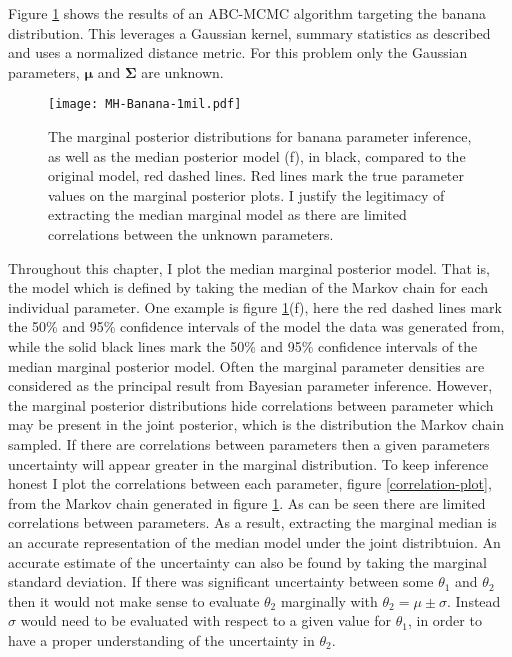 Figure \ref{MH-banana} shows the results of an ABC-MCMC algorithm targeting the banana distribution. This leverages a Gaussian kernel, summary statistics as described and uses a normalized distance metric. For this problem only the Gaussian parameters, $\bm{\mu}$ and $\bm{\Sigma}$ are unknown.\\

\begin{figure}[H]
	\centering
	\texttt{[image: MH-Banana-1mil.pdf]}
	\caption{The marginal posterior distributions for banana parameter inference, as well as the median posterior model (f), in black, compared to the original model, red dashed lines. Red lines mark the true parameter values on the marginal posterior plots. I justify the legitimacy of extracting the median marginal model as there are limited correlations between the unknown parameters.}
	\label{MH-banana}
\end{figure}

Throughout this chapter, I plot the median marginal posterior model. That is, the model which is defined by taking the median of the Markov chain for each individual parameter. One example is figure \ref{MH-banana}(f), here the red dashed lines mark the 50\% and 95\% confidence intervals of the model the data was generated from, while the solid black lines mark the 50\% and 95\% confidence intervals of the median marginal posterior model. Often the marginal parameter densities are considered as the principal result from Bayesian parameter inference. However, the marginal posterior distributions hide correlations between parameter which may be present in the joint posterior, which is the distribution the Markov chain sampled. If there are correlations between parameters then a given parameters uncertainty will appear greater in the marginal distribution. To keep inference honest I plot the correlations between each parameter, figure \ref{correlation-plot}, from the Markov chain generated in figure \ref{MH-banana}. As can be seen there are limited correlations between parameters. As a result, extracting the marginal median is an accurate representation of the median model under the joint distribtuion. An accurate estimate of the uncertainty can also be found by taking the marginal standard deviation. If there was significant uncertainty between some $\theta_1$ and $\theta_2$ then it would not make sense to evaluate $\theta_2$ marginally with $\theta_2 = \mu \pm \sigma$. Instead $\sigma$ would need to be evaluated with respect to a given value for $\theta_1$, in order to have a proper understanding of the uncertainty in $\theta_2$. 

